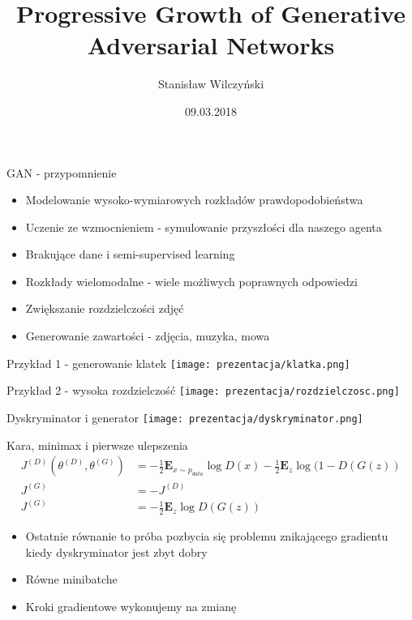 \documentclass[11pt]{beamer}
\author{Stanisław Wilczyński}
\title{Progressive Growth of Generative Adversarial Networks}
\institute{Uniwersytet Wrocławski}
\date{09.03.2018}
\begin{document}
\begin{frame}
\titlepage
\end{frame}
\begin{frame}{GAN - przypomnienie}
\begin{itemize}
    \item Modelowanie wysoko-wymiarowych rozkładów prawdopodobieństwa
    \item Uczenie ze wzmocnieniem - symulowanie przyszłości dla naszego agenta
    \item Brakujące dane i semi-supervised learning
    \item Rozkłady wielomodalne - wiele możliwych poprawnych odpowiedzi
    \item Zwiększanie rozdzielczości zdjęć
    \item Generowanie zawartości - zdjęcia, muzyka, mowa
\end{itemize}
\end{frame}

\begin{frame}{Przykład 1 - generowanie klatek}
\minipage{\textwidth}
\texttt{[image: prezentacja/klatka.png]}
\endminipage
\end{frame}

\begin{frame}{Przykład 2 - wysoka rozdzielczość}
\minipage{\textwidth}
\texttt{[image: prezentacja/rozdzielczosc.png]}
\endminipage
\end{frame}

\begin{frame}{Dyskryminator i generator}
\minipage{\textwidth}
\texttt{[image: prezentacja/dyskryminator.png]}
\endminipage
\end{frame}

\begin{frame}{Kara, minimax i pierwsze ulepszenia}
\begin{align*}
J^{(D)}(\theta^{(D)}, \theta^{(G)}) &= -\frac{1}{2} \mathbf{E}_{x \sim p_{data}} \log D(x) -\frac{1}{2} \mathbf{E}_{z} \log (1-D(G(z)) \\
J^{(G)} &= -J^{(D)} \\ 
J^{(G)} &=  -\frac{1}{2}\mathbf{E}_{z} \log D(G(z))
\end{align*}
\begin{itemize}
    \item Ostatnie równanie to próba pozbycia się problemu znikającego gradientu kiedy dyskryminator jest zbyt dobry
    \item Równe minibatche
    \item Kroki gradientowe wykonujemy na zmianę
\end{itemize}
\end{frame}
\end{document}
